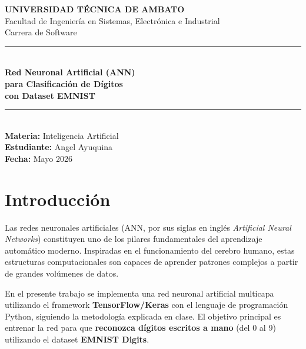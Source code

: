 \documentclass[12pt,a4paper]{article}
\begin{document}
\begin{titlepage}
    \centering
    \vspace*{1cm}
    {\Large \textbf{UNIVERSIDAD TÉCNICA DE AMBATO}}\\[0.5cm]
    {\large Facultad de Ingeniería en Sistemas, Electrónica e Industrial}\\[0.3cm]
    {\large Carrera de Software}\\[2cm]

    \rule{\linewidth}{0.5mm}\\[0.4cm]
    {\LARGE \textbf{Red Neuronal Artificial (ANN)\\para Clasificación de Dígitos\\con Dataset EMNIST}}\\[0.4cm]
    \rule{\linewidth}{0.5mm}\\[2cm]

    {\large \textbf{Materia:} Inteligencia Artificial}\\[0.3cm]
    {\large \textbf{Estudiante:} Angel Ayuquina}\\[0.3cm]
    {\large \textbf{Fecha:} Mayo 2026}\\[3cm]


    \vfill
\end{titlepage}

\tableofcontents
\newpage

\section{Introducción}

Las redes neuronales artificiales (ANN, por sus siglas en inglés \textit{Artificial Neural Networks}) constituyen uno de los pilares fundamentales del aprendizaje automático moderno. Inspiradas en el funcionamiento del cerebro humano, estas estructuras computacionales son capaces de aprender patrones complejos a partir de grandes volúmenes de datos.

En el presente trabajo se implementa una red neuronal artificial multicapa utilizando el framework \textbf{TensorFlow/Keras} con el lenguaje de programación Python, siguiendo la metodología explicada en clase. El objetivo principal es entrenar la red para que \textbf{reconozca dígitos escritos a mano} (del 0 al 9) utilizando el dataset \textbf{EMNIST Digits}.
\end{document}
